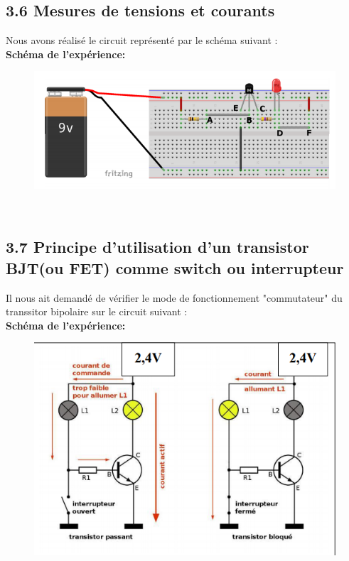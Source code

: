 \documentclass{report}
\begin{document}
\subsection*{3.6 Mesures de tensions et courants}
Nous avons réalisé le circuit représenté par le schéma suivant : \\

\textbf{Schéma de l'expérience: }
\begin{figure}[h!]
\centering
\includegraphics[scale=0.5]{schema.png}
\end{figure} \\

\subsection*{3.7 Principe d'utilisation d'un transistor BJT(ou FET) comme switch ou interrupteur}
Il nous ait demandé de vérifier le mode de fonctionnement "commutateur" du transsitor bipolaire sur le circuit suivant :\\
\textbf{Schéma de l'expérience: }
\begin{figure}[h!]
\centering
\includegraphics[scale=0.5]{end.png}
\end{figure} \\
\newpage
\end{document}
